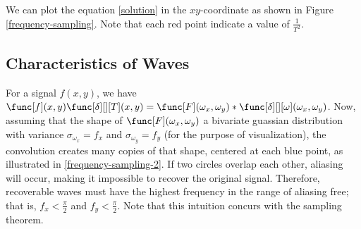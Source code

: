 We can plot the equation \eqref{solution} in the $xy$-coordinate as shown in Figure \ref{frequency-sampling}. Note that each red point indicate a value of $\frac{1}{T^2}$.


\subsection{Characteristics of Waves}
For a signal $f(x,y)$, we have $\func[f](x,y)\func[\delta][][T](x,y) = \func[F](\omega_x,\omega_y) \ast \func[\delta][][\omega](\omega_x,\omega_y)$. Now, assuming that the shape of $\func[F](\omega_x,\omega_y)$ a bivariate guassian distribution with variance $\sigma_{\omega_x} = f_x$ and $\sigma_{\omega_y} = f_y$ (for the purpose of visualization), the convolution creates many copies of that shape, centered at each blue point, as illustrated in \ref{frequency-sampling-2}. If two circles overlap each other, aliasing will occur, making it impossible to recover the original signal. Therefore, recoverable waves must have the highest frequency in the range of aliasing free; that is, $f_x < \frac{\pi}{2}$ and $f_y < \frac{\pi}{2}$. Note that this intuition concurs with the sampling theorem.

